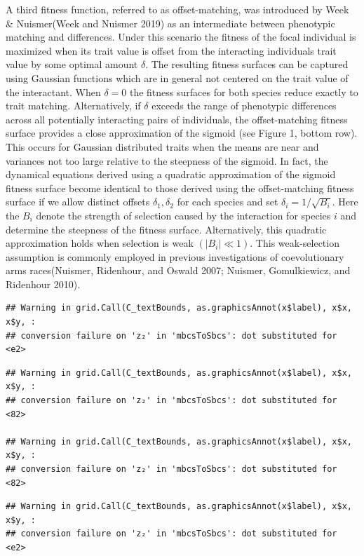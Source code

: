 \documentclass[]{article}
\begin{document}
A third fitness function, referred to as offset-matching, was introduced
by Week \& Nuismer(Week and Nuismer 2019) as an intermediate between
phenotypic matching and differences. Under this scenario the fitness of
the focal individual is maximized when its trait value is offset from
the interacting individuals trait value by some optimal amount
\(\delta\). The resulting fitness surfaces can be captured using
Gaussian functions which are in general not centered on the trait value
of the interactant. When \(\delta=0\) the fitness surfaces for both
species reduce exactly to trait matching. Alternatively, if \(\delta\)
exceeds the range of phenotypic differences across all potentially
interacting pairs of individuals, the offset-matching fitness surface
provides a close approximation of the sigmoid (see Figure 1, bottom
row). This occurs for Gaussian distributed traits when the means are
near and variances not too large relative to the steepness of the
sigmoid. In fact, the dynamical equations derived using a quadratic
approximation of the sigmoid fitness surface become identical to those
derived using the offset-matching fitness surface if we allow distinct
offsets \(\delta_1,\delta_2\) for each species and set
\(\delta_i=1/\sqrt{B_i}\). Here the \(B_i\) denote the strength of
selection caused by the interaction for species \(i\) and determine the
steepness of the fitness surface. Alternatively, this quadratic
approximation holds when selection is weak \((|B_i|\ll1)\). This
weak-selection assumption is commonly employed in previous
investigations of coevolutionary arms races(Nuismer, Ridenhour, and
Oswald 2007; Nuismer, Gomulkiewicz, and Ridenhour 2010).

\begin{verbatim}
## Warning in grid.Call(C_textBounds, as.graphicsAnnot(x$label), x$x, x$y, :
## conversion failure on 'z₂' in 'mbcsToSbcs': dot substituted for <e2>
\end{verbatim}

\begin{verbatim}
## Warning in grid.Call(C_textBounds, as.graphicsAnnot(x$label), x$x, x$y, :
## conversion failure on 'z₂' in 'mbcsToSbcs': dot substituted for <82>

## Warning in grid.Call(C_textBounds, as.graphicsAnnot(x$label), x$x, x$y, :
## conversion failure on 'z₂' in 'mbcsToSbcs': dot substituted for <82>
\end{verbatim}

\begin{verbatim}
## Warning in grid.Call(C_textBounds, as.graphicsAnnot(x$label), x$x, x$y, :
## conversion failure on 'z₂' in 'mbcsToSbcs': dot substituted for <e2>
\end{verbatim}
\end{document}
